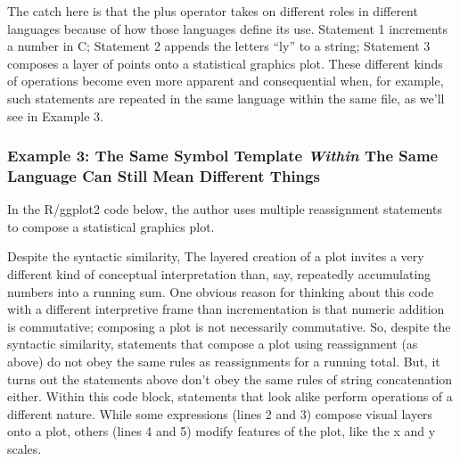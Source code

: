 The catch here is that the plus operator takes on different roles in
different languages because of how those languages define its use.
Statement 1 increments a number in C; Statement 2 appends the letters
``ly'' to a string; Statement 3 composes a layer of points onto a statistical
graphics plot. These different kinds of operations become even more
apparent and consequential when, for example, such statements are
repeated in the same language within the same file, as we'll see in Example 3.

\subsubsection{Example 3: The Same Symbol Template \emph{Within} The Same Language Can Still Mean Different Things}

In the R/ggplot2 code below, the author uses multiple
reassignment statements to compose a statistical graphics plot.

\begin{Shaded}
\begin{Highlighting}[numbers=left,,]
\StringTok{ }\NormalTok{()}
\StringTok{ }\StringTok{ }
\StringTok{ }\StringTok{ }
\StringTok{ }\StringTok{ }
\StringTok{ }\StringTok{ }
\end{Highlighting}
\end{Shaded}

Despite the syntactic similarity, The
layered creation of a plot invites a very different kind of conceptual
interpretation than, say, repeatedly accumulating numbers into a running
sum. One obvious reason for thinking about this code with a different
interpretive frame than incrementation is that numeric addition is commutative; composing a
plot is not necessarily commutative. So, despite the syntactic similarity, statements that
compose a plot using reassignment (as above) do not obey the same
rules as reassignments for a running total. But, it turns out the statements above don't obey the same rules of string concatenation either. Within this code
block, statements that look alike perform operations of a different
nature. While some expressions (lines 2 and 3) compose
visual layers onto a plot, others (lines 4 and 5) modify features of the plot, like the x and y scales.

